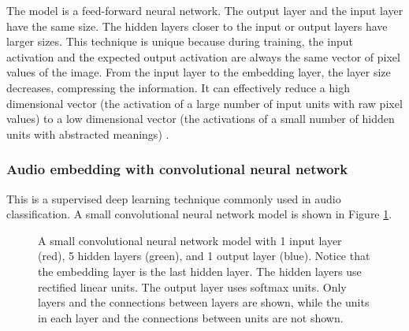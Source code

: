 \documentclass[conference]{IEEEtran}
\begin{document}
The model is a feed-forward neural network.
The output layer and the input layer have the same size.
The hidden layers closer to the input or output layers have larger sizes.
This technique is unique because during training,
the input activation and the expected output activation are always
the same vector of pixel values of the image.
From the input layer to the embedding layer, the layer size decreases,
compressing the information.
It can effectively reduce a high dimensional vector (the activation of a large number of input units with raw pixel values)
to a low dimensional vector (the activations of a small number of hidden units with abstracted meanings)
\cite{hinton2006reducing}.

\subsubsection{Audio embedding with convolutional neural network}
This is a supervised deep learning technique commonly used in audio classification.
A small convolutional neural network model is shown in Figure \ref{fig:cnn}.
\begin{figure}[!ht]
	\centering
	\newcommand{\layersep}{1cm}
	\caption{
		A small convolutional neural network model with
		1 input layer (red), 5 hidden layers (green), and 1 output layer (blue).
		Notice that the embedding layer is the last hidden layer.
		The hidden layers use rectified linear units.
		The output layer uses softmax units.
		Only layers and the connections between layers are shown, while the units in each layer and the connections between units are not shown.
	}
	\label{fig:cnn}
\end{figure}
\end{document}
